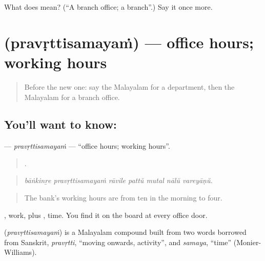 \begin{tcolorbox}[breakable,colback=teal!4,colframe=teal!35!black,title={Before you move on}]
What does  mean? (\textquotedblleft{}A branch office; a branch\textquotedblright{}.) Say it once more.
\end{tcolorbox}
\section[\texorpdfstring{\ml{പ്രവൃത്തിസമയം} (pravṛttisamayaṁ)}{പ്രവൃത്തിസമയം (pravṛttisamayaṁ)}]{ (pravṛttisamayaṁ) — office hours; working hours}

\label{lesson:ML-C486-pravrttisamayam}



\begin{quote}
Before the new one: say the Malayalam for a department, then the Malayalam for a branch office.
\end{quote}

\subsection*{You'll want to know: }
\textbf{} — \emph{pravṛttisamayaṁ} — \textquotedblleft{}office hours; working hours\textquotedblright{}.

\begin{quote}
      .
\end{quote}

\begin{quote}
\emph{bāṅkinṟe pravṛttisamayaṁ rāvile pattŭ mutal nālŭ vareyāṇŭ.}
\end{quote}

\begin{quote}
The bank's working hours are from ten in the morning to four.
\end{quote}

, work, plus , time. You find it on the board at every office door.

\begin{cousinweb}
\textbf{} (\emph{pravṛttisamayaṁ}) is a Malayalam compound built from two words borrowed from Sanskrit, \emph{pravṛtti}, \textquotedblleft{}moving onwards, activity\textquotedblright{}, and \emph{samaya}, \textquotedblleft{}time\textquotedblright{} (Monier-Williams).
\end{cousinweb}

